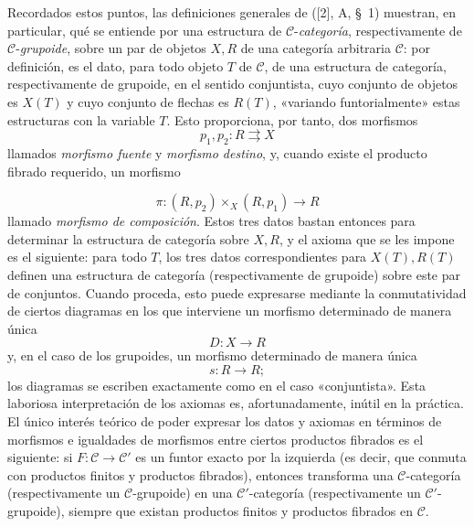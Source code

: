\documentclass[11pt,twoside,openany]{book}
\numberwithin{equation}{section}
\newcommand{\src}[1]{%
  \phantomsection\hypertarget{src:#1}{}%
  \marginpar{\raggedleft\footnotesize\sffamily #1}%
}
\theoremstyle{plain}
\theoremstyle{definition}
\theoremstyle{remark}
\newcommand{\FgaUnitKey}{frontmatter}
\renewcommand{\src}[1]{%
  \phantomsection\hypertarget{src:\FgaUnitKey:#1}{}%
  \marginpar{\raggedleft\footnotesize\sffamily #1}%
}
\theoremstyle{plain}
\theoremstyle{definition}
\theoremstyle{remark}
\begin{document}
Recordados estos puntos, las definiciones generales de ([2], A, \S~1)
muestran, en particular, qué se entiende por una estructura de
$\mathcal C$-\emph{categoría}, respectivamente de
$\mathcal C$-\emph{grupoide}, sobre un par de objetos $X,R$ de una categoría
arbitraria $\mathcal C$: por definición, es el dato, para todo objeto $T$ de
$\mathcal C$, de una estructura de categoría, respectivamente de grupoide, en
el sentido conjuntista, cuyo conjunto de objetos es $X(T)$ y cuyo conjunto de
flechas es $R(T)$, «variando funtorialmente» estas estructuras con la variable
$T$. Esto proporciona, por tanto, dos morfismos
\[
  p_1,p_2:R\rightrightarrows X
\]
llamados \emph{morfismo fuente} y \emph{morfismo destino}, y, cuando existe el
producto fibrado requerido, un morfismo
\src{107}
\[
  \pi:(R,p_2)\times_X(R,p_1)\longrightarrow R
\]
llamado \emph{morfismo de composición}. Estos tres datos bastan entonces para
determinar la estructura de categoría sobre $X,R$, y el axioma que se les
impone es el siguiente: para todo $T$, los tres datos correspondientes para
$X(T),R(T)$ definen una estructura de categoría (respectivamente de grupoide)
sobre este par de conjuntos. Cuando proceda, esto puede expresarse mediante
la conmutatividad de ciertos diagramas en los que interviene un morfismo
determinado de manera única
\[
  D:X\longrightarrow R
\]
y, en el caso de los grupoides, un morfismo determinado de manera única
\[
  s:R\longrightarrow R;
\]
los diagramas se escriben exactamente como en el caso «conjuntista». Esta
laboriosa interpretación de los axiomas es, afortunadamente, inútil en la
práctica. El único interés teórico de poder expresar los datos y axiomas en
términos de morfismos e igualdades de morfismos entre ciertos productos
fibrados es el siguiente: si $F:\mathcal C\to\mathcal C'$ es un funtor exacto
por la izquierda (es decir, que conmuta con productos finitos y productos
fibrados), entonces transforma una $\mathcal C$-categoría (respectivamente un
$\mathcal C$-grupoide) en una $\mathcal C'$-categoría (respectivamente un
$\mathcal C'$-grupoide), siempre que existan productos finitos y productos
fibrados en $\mathcal C$.
\end{document}
